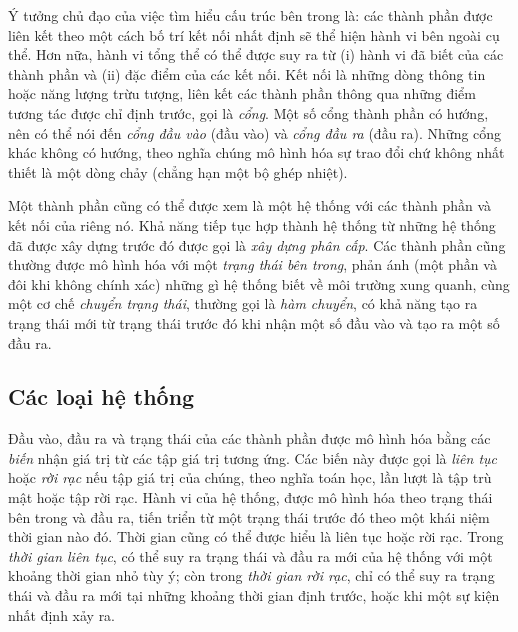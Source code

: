 Ý tưởng chủ đạo của việc tìm hiểu cấu trúc bên trong là: các thành phần được liên kết theo một cách bố trí kết nối nhất định sẽ thể hiện hành vi bên ngoài cụ thể. Hơn nữa, hành vi tổng thể có thể được suy ra từ (i) hành vi đã biết của các thành phần và (ii) đặc điểm của các kết nối. Kết nối là những dòng thông tin hoặc năng lượng trừu tượng, liên kết các thành phần thông qua những điểm tương tác được chỉ định trước, gọi là \emph{cổng}. Một số cổng thành phần có hướng, nên có thể nói đến \emph{cổng đầu vào} (đầu vào) và \emph{cổng đầu ra} (đầu ra). Những cổng khác không có hướng, theo nghĩa chúng mô hình hóa sự trao đổi chứ không nhất thiết là một dòng chảy (chẳng hạn một bộ ghép nhiệt).

Một thành phần cũng có thể được xem là một hệ thống với các thành phần và kết nối của riêng nó. Khả năng tiếp tục hợp thành hệ thống từ những hệ thống đã được xây dựng trước đó được gọi là \emph{xây dựng phân cấp}. Các thành phần cũng thường được mô hình hóa với một \emph{trạng thái bên trong}, phản ánh (một phần và đôi khi không chính xác) những gì hệ thống biết về môi trường xung quanh, cùng một cơ chế \emph{chuyển trạng thái}, thường gọi là \emph{hàm chuyển}, có khả năng tạo ra trạng thái mới từ trạng thái trước đó khi nhận một số đầu vào và tạo ra một số đầu ra.

\subsection{Các loại hệ thống}
Đầu vào, đầu ra và trạng thái của các thành phần được mô hình hóa bằng các \emph{biến} nhận giá trị từ các tập giá trị tương ứng. Các biến này được gọi là \emph{liên tục} hoặc \emph{rời rạc} nếu tập giá trị của chúng, theo nghĩa toán học, lần lượt là tập trù mật hoặc tập rời rạc. Hành vi của hệ thống, được mô hình hóa theo trạng thái bên trong và đầu ra, tiến triển từ một trạng thái trước đó theo một khái niệm thời gian nào đó. Thời gian cũng có thể được hiểu là liên tục hoặc rời rạc. Trong \emph{thời gian liên tục}, có thể suy ra trạng thái và đầu ra mới của hệ thống với một khoảng thời gian nhỏ tùy ý; còn trong \emph{thời gian rời rạc}, chỉ có thể suy ra trạng thái và đầu ra mới tại những khoảng thời gian định trước, hoặc khi một sự kiện nhất định xảy ra.

